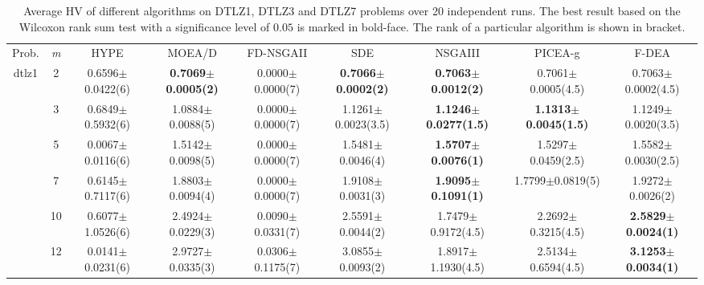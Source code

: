 \begin{table*}[htbp]
\centering

\caption{Average HV of different algorithms on DTLZ1, DTLZ3 and DTLZ7 problems over 20 independent runs. The best result based on the Wilcoxon rank sum test with a significance level of $0.05$ is marked in bold-face. The rank of a particular algorithm is shown in bracket.}

\label{table:dtlzhv}

\renewcommand{\arraystretch}{1.1}
\begin{adjustbox}{width=1.0\textwidth,center}
\begin{tabular}{ccccccccc}
\thickhline
Prob. & \textit{m} & HYPE               & MOEA/D                       & FD-NSGAII          & SDE                          & NSGAIII                     & PICEA-g                     & F-DEA                       \\\thickhline
dtlz1 & 2          & 0.6596$\pm$0.0422(6)   & \textbf{0.7069$\pm$0.0005(2)}   & 0.0000$\pm$0.0000(7)   & \textbf{0.7066$\pm$0.0002(2)}    & \textbf{0.7063$\pm$0.0012(2)}   & 0.7061$\pm$0.0005(4.5)          & 0.7063$\pm$0.0002(4.5)          \\
      & 3          & 0.6849$\pm$0.5932(6)   & 1.0884$\pm$0.0088(5)            & 0.0000$\pm$0.0000(7)   & 1.1261$\pm$0.0023(3.5)           & \textbf{1.1246$\pm$0.0277(1.5)} & \textbf{1.1313$\pm$0.0045(1.5)} & 1.1249$\pm$0.0020(3.5)          \\
      & 5          & 0.0067$\pm$0.0116(6)   & 1.5142$\pm$0.0098(5)            & 0.0000$\pm$0.0000(7)   & 1.5481$\pm$0.0046(4)             & \textbf{1.5707$\pm$0.0076(1)}   & 1.5297$\pm$0.0459(2.5)          & 1.5582$\pm$0.0030(2.5)          \\
      & 7          & 0.6145$\pm$0.7117(6)   & 1.8803$\pm$0.0094(4)            & 0.0000$\pm$0.0000(7)   & 1.9108$\pm$0.0031(3)             & \textbf{1.9095$\pm$0.1091(1)}   & 1.7799$\pm$0.0819(5)            & 1.9272$\pm$0.0026(2)            \\
      & 10         & 0.6077$\pm$1.0526(6)   & 2.4924$\pm$0.0229(3)            & 0.0090$\pm$0.0331(7)   & 2.5591$\pm$0.0044(2)             & 1.7479$\pm$0.9172(4.5)          & 2.2692$\pm$0.3215(4.5)          & \textbf{2.5829$\pm$0.0024(1)}   \\
      & 12         & 0.0141$\pm$0.0231(6)   & 2.9727$\pm$0.0335(3)            & 0.0306$\pm$0.1175(7)   & 3.0855$\pm$0.0093(2)             & 1.8917$\pm$1.1930(4.5)          & 2.5134$\pm$0.6594(4.5)          & \textbf{3.1253$\pm$0.0034(1)}   \\

\end{tabular}
\end{adjustbox}
\end{table*}

